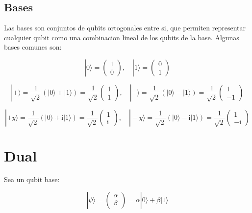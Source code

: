 \documentclass[11pt]{article}
\newcommand{\ii}{\mathrm{i}}
\begin{document}
\subsection{Bases}

Las bases son conjuntos de qubits ortogonales entre si, que permiten representar cualquier qubit como una combinacion lineal de los qubits de la base. Algunas bases comunes son:

\begin{equation}
    |0\rangle = \begin{pmatrix} 1 \\ 0 \end{pmatrix}, \quad |1\rangle = \begin{pmatrix} 0 \\ 1 \end{pmatrix}
\end{equation}

\begin{equation}
    |+\rangle = \frac{1}{\sqrt{2}} (|0\rangle + |1\rangle) = \frac{1}{\sqrt{2}} \begin{pmatrix} 1 \\ 1 \end{pmatrix}, \quad |-\rangle = \frac{1}{\sqrt{2}} (|0\rangle - |1\rangle) = \frac{1}{\sqrt{2}} \begin{pmatrix} 1 \\ -1 \end{pmatrix}
\end{equation}

\begin{equation}
    |+y\rangle = \frac{1}{\sqrt{2}} (|0\rangle + \ii |1\rangle) = \frac{1}{\sqrt{2}} \begin{pmatrix} 1 \\ \ii \end{pmatrix}, \quad |-y\rangle = \frac{1}{\sqrt{2}} (|0\rangle - \ii |1\rangle) = \frac{1}{\sqrt{2}} \begin{pmatrix} 1 \\ -\ii \end{pmatrix}
\end{equation}


\section{Dual}

Sea un qubit base:

\begin{equation}
    |\psi\rangle = \begin{pmatrix} \alpha \\ \beta \end{pmatrix} = \alpha |0\rangle + \beta |1\rangle
\end{equation}
\end{document}
